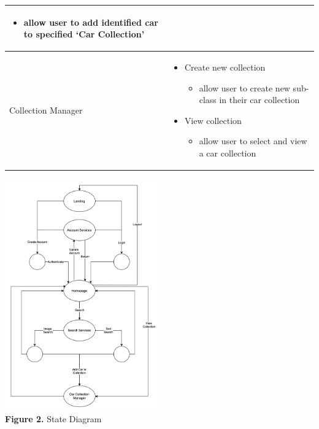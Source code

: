 \documentclass[]{article}
\begin{document}
\begin{tabular}{|p{3cm}|p{13cm}|}
\begin{itemize} [left=2pt]
\begin{itemize}
			\item allow user to add identified car to specified ‘Car Collection’
		\end{itemize}
	\end{itemize} \\
	\hline
	Collection Manager &
	\begin{itemize} [left=2pt]
		\item Create new collection
		\begin{itemize}
			\item allow user to create new sub-class in their car collection
		\end{itemize}
		\item View collection
		\begin{itemize}
			\item allow user to select and view a car collection
		\end{itemize}
	\end{itemize} \\
	\hline
\end{tabular}

\begin{center}
	\includegraphics[width=0.5\textwidth]{images/state_diagram.png} \\
	\textbf{Figure 2. } State Diagram
\end{center}
\end{document}
